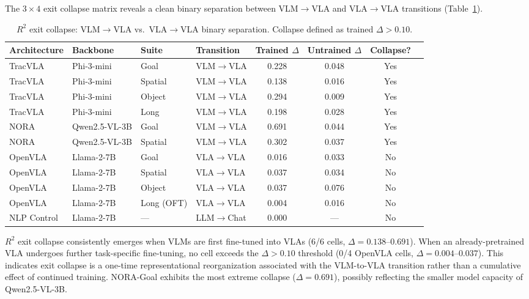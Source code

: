\documentclass[10pt,twocolumn]{article}
\begin{document}
The $3 \times 4$ exit collapse matrix reveals a clean binary separation between VLM$\to$VLA and VLA$\to$VLA transitions (Table~\ref{tab:collapse}).

\begin{table}[t]
\centering
\caption{$R^2$ exit collapse: VLM$\to$VLA vs.\ VLA$\to$VLA binary separation. Collapse defined as trained $\Delta > 0.10$.}
\label{tab:collapse}
\small
\begin{tabular}{llllcccc}
\toprule
Architecture & Backbone & Suite & Transition & Trained $\Delta$ & Untrained $\Delta$ & Collapse? \\
\midrule
TracVLA & Phi-3-mini & Goal & VLM$\to$VLA & 0.228 & 0.048 & Yes \\
TracVLA & Phi-3-mini & Spatial & VLM$\to$VLA & 0.138 & 0.016 & Yes \\
TracVLA & Phi-3-mini & Object & VLM$\to$VLA & 0.294 & 0.009 & Yes \\
TracVLA & Phi-3-mini & Long & VLM$\to$VLA & 0.198 & 0.028 & Yes \\
NORA & Qwen2.5-VL-3B & Goal & VLM$\to$VLA & 0.691 & 0.044 & Yes \\
NORA & Qwen2.5-VL-3B & Spatial & VLM$\to$VLA & 0.302 & 0.037 & Yes \\
\midrule
OpenVLA & Llama-2-7B & Goal & VLA$\to$VLA & 0.016 & 0.033 & No \\
OpenVLA & Llama-2-7B & Spatial & VLA$\to$VLA & 0.037 & 0.034 & No \\
OpenVLA & Llama-2-7B & Object & VLA$\to$VLA & 0.037 & 0.076 & No \\
OpenVLA & Llama-2-7B & Long (OFT) & VLA$\to$VLA & 0.004 & 0.016 & No \\
\midrule
NLP Control & Llama-2-7B & --- & LLM$\to$Chat & 0.000 & --- & No \\
\bottomrule
\end{tabular}
\end{table}

$R^2$ exit collapse consistently emerges when VLMs are first fine-tuned into VLAs (6/6 cells, $\Delta = 0.138$--$0.691$).
When an already-pretrained VLA undergoes further task-specific fine-tuning, no cell exceeds the $\Delta > 0.10$ threshold (0/4 OpenVLA cells, $\Delta = 0.004$--$0.037$).
This indicates exit collapse is a one-time representational reorganization associated with the VLM-to-VLA transition rather than a cumulative effect of continued training.
NORA-Goal exhibits the most extreme collapse ($\Delta = 0.691$), possibly reflecting the smaller model capacity of Qwen2.5-VL-3B.
\end{document}
